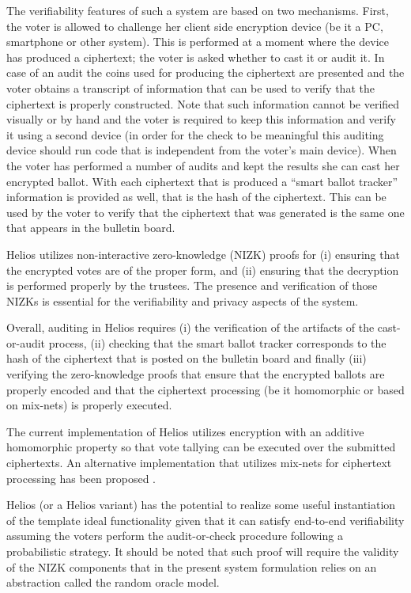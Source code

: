 The verifiability features of such a system are based on two
mechanisms. First, the voter is allowed to challenge her client side
encryption device (be it a PC, smartphone or other system). This is
performed at a moment where the device has produced a ciphertext; the
voter is asked whether to cast it or audit it. In case of an audit the
coins used for producing the ciphertext are presented and the voter
obtains a transcript of information that can be used to verify that
the ciphertext is properly constructed. Note that such information
cannot be verified visually or by hand and the voter is required to
keep this information and verify it using a second device (in order
for the check to be meaningful this auditing device should run code
that is independent from the voter's main device). When the voter has
performed a number of audits and kept the results she can cast her
encrypted ballot. With each ciphertext that is produced a ``smart
ballot tracker'' information is provided as well, that is the hash of
the ciphertext. This can be used by the voter to verify that the
ciphertext that was generated is the same one that appears in the
bulletin board.

Helios utilizes non-interactive zero-knowledge (NIZK) proofs for (i)
ensuring that the encrypted votes are of the proper form, and (ii)
ensuring that the decryption is performed properly by the
trustees. The presence and verification of those NIZKs is essential
for the verifiability and privacy aspects of the system.

Overall, auditing in Helios requires (i) the verification of the
artifacts of the cast-or-audit process, (ii) checking that the smart
ballot tracker corresponds to the hash of the ciphertext that is
posted on the bulletin board and finally (iii) verifying the
zero-knowledge proofs that ensure that the encrypted ballots are
properly encoded and that the ciphertext processing (be it homomorphic
or based on mix-nets) is properly executed.

The current implementation of Helios utilizes encryption with an
additive homomorphic property so that vote tallying can be executed
over the submitted ciphertexts. An alternative implementation that
utilizes mix-nets for ciphertext processing has been proposed
\cite{zeus}.

Helios (or a Helios variant) has the potential to realize some useful
instantiation of the template ideal functionality given that it can
satisfy end-to-end verifiability assuming the voters perform the
audit-or-check procedure following a probabilistic strategy. It should
be noted that such proof will require the validity of the NIZK
components that in the present system formulation relies on an
abstraction called the random oracle model.

